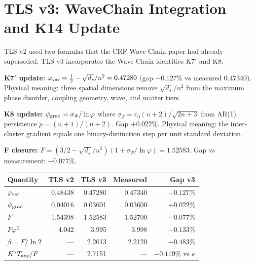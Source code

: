 \documentclass[12pt, a4paper]{article}
\begin{document}
\section{TLS v3: WaveChain Integration and K14 Update}

TLS v2 used two formulas that the CRF Wave Chain paper had already superseded. TLS v3 incorporates the Wave Chain identities K7$'$ and K8.

\begin{derivedbox}[title={TLS v3 Update: From v2 to v3 (CRF\_TLS\_v3\_WaveChain)}]
\textbf{K7$'$ update:} $\varphi_{\rm var} = \tfrac{1}{2} - \sqrt{d_s}/n^2 = 0.47280$ (gap $-0.127\%$ vs measured $0.47340$).
Physical meaning: three spatial dimensions remove $\sqrt{d_s}/n^2$ from the maximum phase disorder, coupling geometry, wave, and matter tiers.

\textbf{K8 update:} $\psi_{\rm grad} = \sigma_\Psi/\ln\varphi$ where $\sigma_\Psi = \varepsilon_0(n+2)/\sqrt{2n+3}$ from AR(1) persistence $p = (n+1)/(n+2)$. Gap $+0.022\%$. Physical meaning: the inter-cluster gradient equals one binary-distinction step per unit standard deviation.

\textbf{F closure:} $F = (3/2 - \sqrt{d_s}/n^2)(1 + \sigma_\Psi/\ln\varphi) = 1.52583$. Gap vs measurement: $-0.077\%$.

\begin{center}
\renewcommand{\arraystretch}{1.2}
\begin{tabular}{lrrrr}
\toprule
\textbf{Quantity} & \textbf{TLS v2} & \textbf{TLS v3} & \textbf{Measured} & \textbf{Gap v3} \\
\midrule
$\varphi_{\rm var}$ & 0.48438 & 0.47280 & 0.47340 & $-0.127\%$ \\
$\psi_{\rm grad}$ & 0.04016 & 0.03601 & 0.03600 & $+0.022\%$ \\
$F$ & 1.54398 & 1.52583 & 1.52700 & $-0.077\%$ \\
$F\varphi^2$ & 4.042 & 3.995 & 3.998 & $-0.133\%$ \\
$\beta = F/\ln 2$ & --- & 2.2013 & 2.2120 & $-0.483\%$ \\
$K^*T_{\rm avg}/F$ & --- & 2.7151 & --- & $-0.119\%$ vs $e$ \\
\bottomrule
\end{tabular}
\end{center}
\end{derivedbox}
\end{document}
